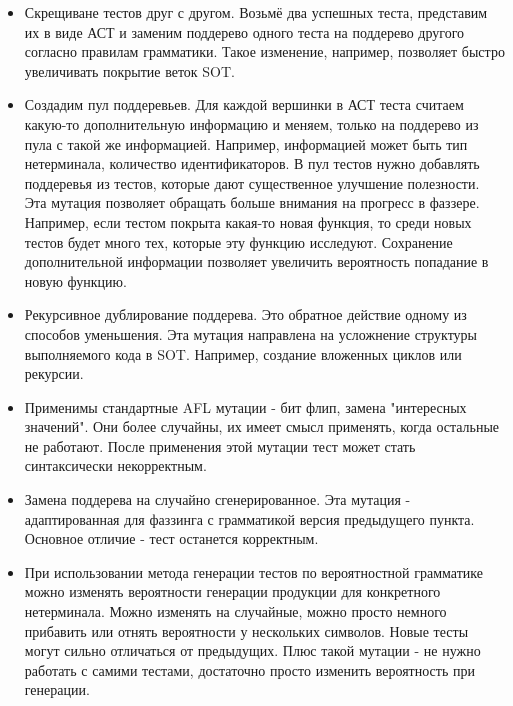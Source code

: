\documentclass[a4paper]{article}
\begin{document}
\begin{itemize}
\item Скрещиване тестов друг с другом. Возьмё два успешных теста, представим их в виде АСТ и заменим поддерево одного теста на поддерево другого согласно правилам грамматики. Такое изменение, например, позволяет быстро увеличивать покрытие веток SOT.   
\item Создадим пул поддеревьев. Для каждой вершинки в АСТ теста считаем  какую-то дополнительную информацию и меняем, только на поддерево из пула с такой же информацией. Например, информацией может быть тип нетерминала, количество идентификаторов. В пул тестов нужно добавлять поддеревья из тестов, которые дают существенное улучшение полезности. Эта мутация позволяет обращать больше внимания на прогресс в фаззере. Например, если тестом покрыта какая-то новая функция, то среди новых тестов будет много тех, которые эту функцию исследуют. Сохранение дополнительной информации позволяет увеличить вероятность попадание в новую функцию.
\item Рекурсивное дублирование поддерева. Это обратное действие одному из способов уменьшения. Эта мутация направлена на усложнение структуры выполняемого кода в SOT. Например, создание вложенных циклов или рекурсии. 
\item Применимы стандартные AFL мутации - бит флип, замена "интересных значений". Они более случайны, их имеет смысл применять, когда остальные не работают. После применения этой мутации тест может стать синтаксически некорректным.
\item Замена поддерева на случайно сгенерированное. Эта мутация - адаптированная для фаззинга с грамматикой версия предыдущего пункта. Основное отличие - тест останется корректным.
\item При использовании метода генерации тестов по вероятностной грамматике можно изменять вероятности генерации продукции для конкретного нетерминала. Можно изменять на случайные, можно просто немного прибавить или отнять вероятности у нескольких символов. Новые тесты могут сильно отличаться от предыдущих. Плюс такой мутации - не нужно работать с самими тестами, достаточно просто изменить вероятность при генерации.  
\end{itemize}
\end{document}
